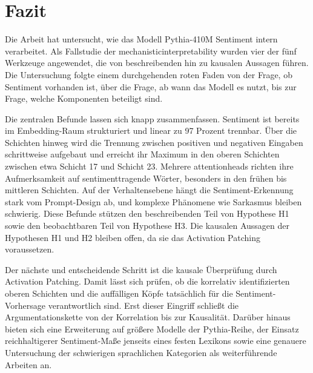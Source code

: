 \section{Fazit}

Die Arbeit hat untersucht, wie das Modell Pythia-410M Sentiment intern verarbeitet. Als Fallstudie der \gls{mechanisticinterpretability} wurden vier der fünf Werkzeuge angewendet, die von beschreibenden hin zu kausalen Aussagen führen. Die Untersuchung folgte einem durchgehenden roten Faden von der Frage, ob Sentiment vorhanden ist, über die Frage, ab wann das Modell es nutzt, bis zur Frage, welche Komponenten beteiligt sind.

Die zentralen Befunde lassen sich knapp zusammenfassen. Sentiment ist bereits im Embedding-Raum strukturiert und linear zu 97 Prozent trennbar. Über die Schichten hinweg wird die Trennung zwischen positiven und negativen Eingaben schrittweise aufgebaut und erreicht ihr Maximum in den oberen Schichten zwischen etwa Schicht 17 und Schicht 23. Mehrere \glspl{attentionhead} richten ihre Aufmerksamkeit auf sentimenttragende Wörter, besonders in den frühen bis mittleren Schichten. Auf der Verhaltensebene hängt die Sentiment-Erkennung stark vom Prompt-Design ab, und komplexe Phänomene wie Sarkasmus bleiben schwierig. Diese Befunde stützen den beschreibenden Teil von Hypothese H1 sowie den beobachtbaren Teil von Hypothese H3. Die kausalen Aussagen der Hypothesen H1 und H2 bleiben offen, da sie das Activation Patching voraussetzen.

Der nächste und entscheidende Schritt ist die kausale Überprüfung durch Activation Patching. Damit lässt sich prüfen, ob die korrelativ identifizierten oberen Schichten und die auffälligen Köpfe tatsächlich für die Sentiment-Vorhersage verantwortlich sind. Erst dieser Eingriff schließt die Argumentationskette von der Korrelation bis zur Kausalität. Darüber hinaus bieten sich eine Erweiterung auf größere Modelle der Pythia-Reihe, der Einsatz reichhaltigerer Sentiment-Maße jenseits eines festen Lexikons sowie eine genauere Untersuchung der schwierigen sprachlichen Kategorien als weiterführende Arbeiten an.
